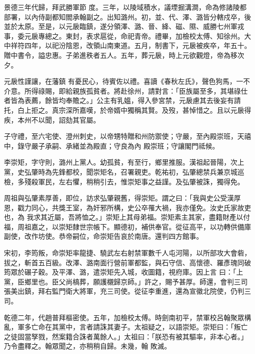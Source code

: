 \begin{pinyinscope}
 景德三年代歸，拜武勝軍節
 度。三年，以陵域積水，議堙掘溝澗，命為修諸陵都部署，以內侍副都知閻承翰副之。出知潞州。初，並、代、澤、潞皆分轄戍卒，後並於太原。至是，以元扆臨鎮，遂分領澤、潞、晉、絳、磁、隰、威勝七州軍戎事，委元扆專總之。東封，表求扈從，命祀青帝。禮畢，加檢校太傅、知徐州。大中祥符四年，以祀汾陰恩，改領山南東道。五月，制書下，元扆被疾卒，年五十。贈中書令，謚忠惠。子弟進秩者五人。五年，葬元扆，時上元欲觀燈，帝為移次夕。



 元扆性謹讓，在藩鎮
 有憂民心，待賓佐以禮。喜讀《春秋左氏》，聲色狗馬，一不介意。所得祿賜，即給親族孤貧者。將赴徐州，請對言：「臣族屬至多，其堪祿仕者皆為表薦，餘皆均奉贍之。」公主有乳媼，得入參宮禁，元扆慮其去後妄有請托，白上拒之。真宗深所嘉嘆，於帝婿中獨稱其賢。及歿，甚悼惜之。且以元扆得疾，本州不以聞，詔劾其官屬。



 子守禮，至六宅使、澄州刺史，以帝甥特贈和州防禦使；守嚴，至內殿崇班，天禧中，錄守嚴子承嗣、承緒並為殿直；守良為內
 殿崇班；守讓閣門祗候。



 李崇矩，字守則，潞州上黨人。幼孤貧，有至行，鄉里推服。漢祖起晉陽，次上黨，史弘肇時為先鋒都校，聞崇矩名，召署親吏。乾祐初，弘肇總禁兵兼京城巡檢，多殘殺軍民，左右懼，稍稍引去，惟崇矩事之益謹。及弘肇被誅，獨得免。



 周祖與弘肇素厚善，即位，訪求弘肇親舊，得崇矩。謂之曰：「我與史公受漢厚恩，戳力同心，共獎王室，為奸邪所構，史公卒罹大禍，我亦僅免。汝史氏家故吏也，為
 我求其近屬，吾將恤之。」崇矩上其母弟福。崇矩素主其家，盡籍財產以付福，周祖嘉之，以崇矩隸世宗帳下。顯德初，補供奉官。從征高平，以功轉供備庫副使，改作坊使。恭帝嗣位，命崇矩告哀於南唐。還判四方館事。



 宋初，李筠叛，命崇矩率龍捷、驍武左右射禁軍數千人屯河陽，以所部攻大會砦，拔之，斬首五百級。改澤、潞南面行營前軍都監，與石守信、高懷德、羅彥瑰同破筠眾於碾子穀。及平澤、潞，遣崇矩先入城，收圖籍，視府庫。因上言
 曰：「上黨，臣鄉里也。臣父尚槁葬，願護櫬歸京師。」許之，賜予甚厚。師還，會判三司張美出鎮，拜右監門衛大將軍，充三司使。從征李重進，還為宣徽北院使，仍判三司。



 乾德二年，代趙普拜樞密使。五年，加檢校太傅。時劍南初平，禁軍校呂翰聚眾構亂，軍多亡命在其黨中，言者請誅其妻子。太祖疑之，以語崇矩。崇矩曰：「叛亡之徒固當孥戮，然案籍合誅者萬餘人。」太祖曰：「朕恐有被其驅率，非本心者。」乃令盡釋之。翰眾聞之，亦稍稍自歸。未幾，翰
 敗滅。




\end{pinyinscope}
